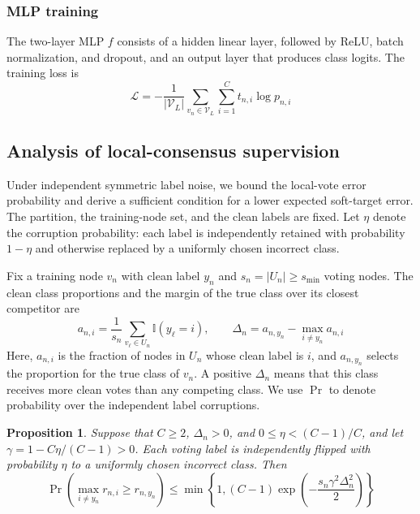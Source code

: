 \documentclass[10pt,letterpaper,nopreprintline]{elsarticle}
\theoremstyle{definition}
\theoremstyle{plain}
\newtheorem{proposition}{Proposition}
\begin{document}


\subsubsection{MLP training}\label{sec:3.3.3}

The two-layer MLP \(f\) consists of a hidden linear layer, followed by ReLU, batch normalization, and dropout, and an output layer that produces class logits. The training loss is
\begin{equation}\label{eq:13}
\mathcal L=-\frac{1}{|\mathcal V_L|}\sum_{v_n\in\mathcal V_L}\sum_{i=1}^C t_{n,i}\log p_{n,i}
\end{equation}

\subsection{Analysis of local-consensus supervision}\label{sec:3.4}

Under independent symmetric label noise, we bound the local-vote error probability and derive a sufficient condition for a lower expected soft-target error. The partition, the training-node set, and the clean labels are fixed. Let \(\eta\) denote the corruption probability: each label is independently retained with probability \(1-\eta\) and otherwise replaced by a uniformly chosen incorrect class.

Fix a training node \(v_n\) with clean label \(y_n\) and \(s_n=|U_n|\geq s_{\min}\) voting nodes. The clean class proportions and the margin of the true class over its closest competitor are
\begin{equation}\label{eq:14}
a_{n,i}=\frac{1}{s_n}\sum_{v_\ell\in U_n}\mathbb I(y_\ell=i),
\qquad
\Delta_n=a_{n,y_n}-\max_{i\ne y_n}a_{n,i}
\end{equation}
Here, \(a_{n,i}\) is the fraction of nodes in \(U_n\) whose clean label is \(i\), and \(a_{n,y_n}\) selects the proportion for the true class of \(v_n\). A positive \(\Delta_n\) means that this class receives more clean votes than any competing class. We use \(\Pr\) to denote probability over the independent label corruptions.

\begin{proposition}\label{prop:local_vote}
Suppose that \(C\geq2\), \(\Delta_n>0\), and \(0\leq\eta<(C-1)/C\), and let \(\gamma=1-C\eta/(C-1)>0\). Each voting label is independently flipped with probability \(\eta\) to a uniformly chosen incorrect class. Then
\begin{equation}\label{eq:15}
\Pr\!\left(\max_{i\ne y_n}r_{n,i}\geq r_{n,y_n}\right)
\leq\min\!\left\{1,(C-1)\exp\!\left(-\frac{s_n\gamma^2\Delta_n^2}{2}\right)\right\}
\end{equation}
\end{proposition}
\end{document}
